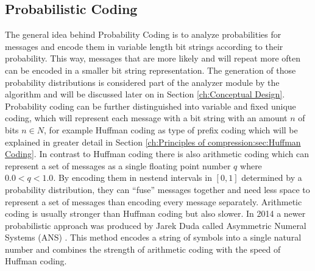 \subsection{Probabilistic Coding}
\par{
The general idea behind Probability Coding is to analyze probabilities for messages and encode them in variable length bit strings according to their probability. This way, messages that are more likely and will repeat more often can be encoded in a smaller bit string representation. The generation of those probability distributions is considered part of the analyzer module by the algorithm and will be discussed later on in Section \ref{ch:Conceptual Design}. Probability coding can be further distinguished into variable and fixed unique coding, which will represent each message with a bit string with an amount $n$ of bits $n \in N$, for example Huffman coding as type of prefix coding which will be explained in greater detail in Section \ref{ch:Principles of compression:sec:Huffman Coding}. In contrast to Huffman coding there is also arithmetic coding which can represent a set of messages as a single floating point number $q$ where $0.0 < q < 1.0$. By encoding them in nestend intervals in $[0,1]$ determined by a probability distribution, they can \enquote{fuse} messages together and need less space to represent a set of messages than encoding every message separately. Arithmetic coding is usually stronger than Huffman coding but also slower. In 2014 a newer probabilistic approach was produced by Jarek Duda called Asymmetric Numeral Systems (ANS) \cite{DBLP:journals/corr/Duda13}. This method encodes a string of symbols into a single natural number and combines the strength of arithmetic coding with the speed of Huffman coding.
}

